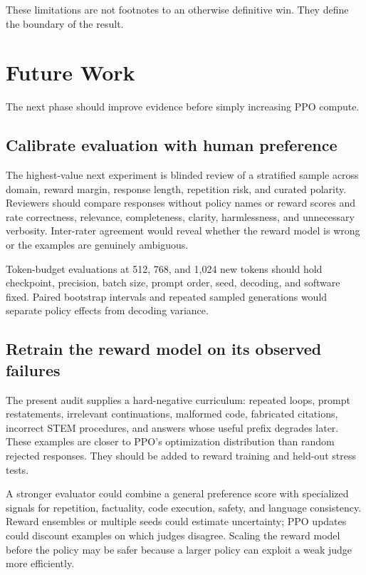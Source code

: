 \documentclass[11pt]{article}
\begin{document}
These limitations are not footnotes to an otherwise definitive win. They
define the boundary of the result.

\section{Future Work}

The next phase should improve evidence before simply increasing PPO compute.

\subsection{Calibrate evaluation with human preference}

The highest-value next experiment is blinded review of a stratified sample
across domain, reward margin, response length, repetition risk, and curated
polarity. Reviewers should compare responses without policy names or reward
scores and rate correctness, relevance, completeness, clarity, harmlessness,
and unnecessary verbosity. Inter-rater agreement would reveal whether the
reward model is wrong or the examples are genuinely ambiguous.

Token-budget evaluations at 512, 768, and 1,024 new tokens should hold
checkpoint, precision, batch size, prompt order, seed, decoding, and software
fixed. Paired bootstrap intervals and repeated sampled generations would
separate policy effects from decoding variance.

\subsection{Retrain the reward model on its observed failures}

The present audit supplies a hard-negative curriculum: repeated loops, prompt
restatements, irrelevant continuations, malformed code, fabricated citations,
incorrect STEM procedures, and answers whose useful prefix degrades later.
These examples are closer to PPO's optimization distribution than random
rejected responses. They should be added to reward training and held-out
stress tests.

A stronger evaluator could combine a general preference score with specialized
signals for repetition, factuality, code execution, safety, and language
consistency. Reward ensembles or multiple seeds could estimate uncertainty;
PPO updates could discount examples on which judges disagree. Scaling the
reward model before the policy may be safer because a larger policy can
exploit a weak judge more efficiently.
\end{document}
